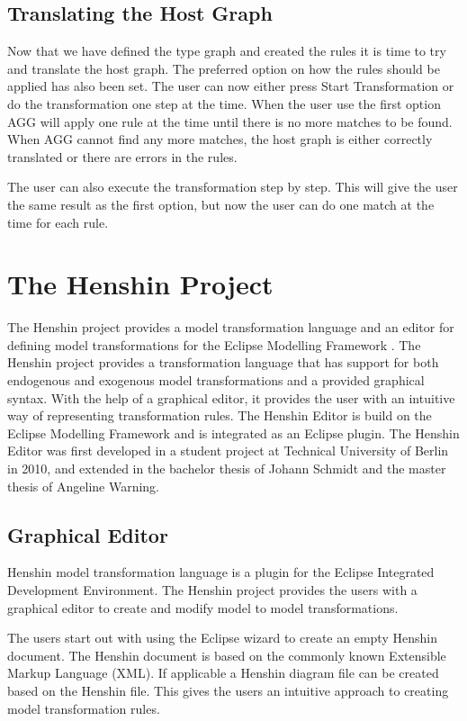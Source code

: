 \documentclass[pdftex,11pt,a4paper]{article}
\begin{document}
\subsection{Translating the Host Graph}

Now that we have defined the type graph and created the rules it is time to try
and translate the host graph. The preferred option on how the rules should be
applied has also been set. The user can now either press Start Transformation or
do the transformation one step at the time. When the user use the first option
AGG will apply one rule at the time until there is no more matches to be found.
When AGG cannot find any more matches, the host graph is either correctly
translated or there are errors in the rules. 

The user can also execute the transformation step by step. This will give the
user the same result as the first option, but now the user can do one match at
the time for each rule. 


\section{The Henshin Project}

\noindent The Henshin project\cite{Henshin} provides a model transformation
language and an editor for defining model transformations for the Eclipse
Modelling Framework \cite{Steinberg2009}. The Henshin project provides a
transformation language that has support for both endogenous and exogenous
model transformations and a provided graphical syntax. With the help of a
graphical editor, it provides the user with an intuitive way of representing
transformation rules. The Henshin Editor is build on the Eclipse Modelling
Framework and is integrated as an Eclipse plugin. The Henshin Editor was first
developed in a student project at Technical University of Berlin in 2010, and
extended in the bachelor thesis \cite{JohannSchmidt} of Johann Schmidt and the
master thesis \cite{AngelineWarning} of Angeline Warning.

\subsection{Graphical Editor}
\noindent Henshin model transformation language is a plugin for the Eclipse
Integrated Development Environment\cite{Eclipse}. The Henshin project provides
the users with a graphical editor to create and modify model to model
transformations. 

The users start out with using the Eclipse wizard to create an empty Henshin
document. The Henshin document is based on the commonly known Extensible Markup
Language (XML)\cite{XML}. If applicable a Henshin diagram file can be created
based on the Henshin file. This gives the users an intuitive approach to
creating model transformation rules.
\end{document}
